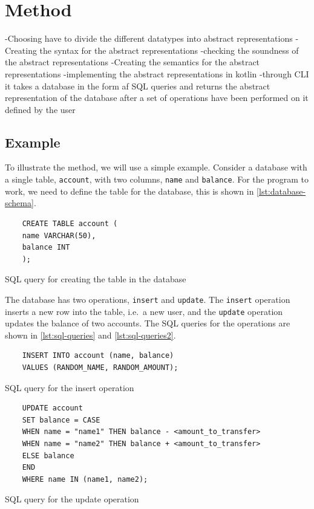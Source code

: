 \section{Method}
\label{sec:method}
-Choosing have to divide the different datatypes into abstract representations
-Creating the syntax for the abstract representations
-checking the soundness of the abstract representations
-Creating the semantics for the abstract representations
-implementing the abstract representations in kotlin
-through CLI it takes a database in the form af SQL queries and returns the abstract representation of the database after a set of operations have been performed on it defined by the user

\subsection{Example}\label{subsec:example1}
To illustrate the method, we will use a simple example.
Consider a database with a single table, \texttt{account}, with two columns, \texttt{name} and \texttt{balance}.
For the program to work, we need to define the table for the database, this is shown in \autoref{lst:database-schema}.


\begin{listing}[htb!]
    \begin{verbatim}
    CREATE TABLE account (
    name VARCHAR(50),
    balance INT
    );
    \end{verbatim}
    \caption{SQL query for creating the table in the database}
    \label{lst:database-schema}
\end{listing}


The database has two operations, \texttt{insert} and \texttt{update}.
The \texttt{insert} operation inserts a new row into the table, i.e.\ a new user, and the \texttt{update} operation updates the balance of two accounts.
The SQL queries for the operations are shown in \autoref{lst:sql-queries} and \autoref{lst:sql-queries2}.


\begin{listing}[htb!]
    \begin{verbatim}
    INSERT INTO account (name, balance)
    VALUES (RANDOM_NAME, RANDOM_AMOUNT);
    \end{verbatim}
    \caption{SQL query for the insert operation}
    \label{lst:sql-queries}
\end{listing}


\begin{listing}[htb!]
    \begin{verbatim}
    UPDATE account
    SET balance = CASE
    WHEN name = "name1" THEN balance - <amount_to_transfer>
    WHEN name = "name2" THEN balance + <amount_to_transfer>
    ELSE balance
    END
    WHERE name IN (name1, name2);
    \end{verbatim}
    \caption{SQL query for the update operation}
    \label{lst:sql-queries2}
\end{listing}


